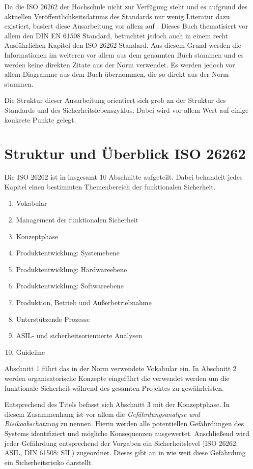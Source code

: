 \documentclass[a4paper,DIV=calc,ngerman]{scrartcl}
\begin{document}
Da die ISO 26262 der Hochschule nicht zur Verfügung steht und es aufgrund des aktuellen Veröffentlichkeitsdatums des Standards nur wenig Literatur dazu existiert, basiert diese Ausarbeitung vor allem auf \cite{1}. Dieses Buch thematisiert vor allem den DIN EN 61508 Standard, betrachtet jedoch auch in einem recht Ausführlichen Kapitel den ISO 26262 Standard. Aus diesem Grund werden die Informationen im weiteren vor allem aus dem genannten Buch stammen und es werden keine direkten Zitate aus der Norm verwendet. Es werden jedoch vor allem Diagramme aus dem Buch übernommen, die so direkt aus der Norm stammen.

Die Struktur dieser Ausarbeitung orientiert sich grob an der Struktur des Standards und des Sicherheitslebenszyklus. Dabei wird vor allem Wert auf einige konkrete Punkte gelegt.

\section{Struktur und Überblick ISO 26262}
\label{sec:Struktur}
Die ISO 26262 ist in insgesamt 10 Abschnitte aufgeteilt. Dabei behandelt jedes Kapitel einen bestimmten Themenbereich der funktionalen Sicherheit.

\begin{enumerate}
    \item Vokabular
    \item Management der funktionalen Sicherheit
    \item Konzeptphase
    \item Produktentwicklung: Systemebene
    \item Produktentwicklung: Hardwareebene
    \item Produktentwicklung: Softwareebene
    \item Produktion, Betrieb und Außerbetriebnahme
    \item Unterstützende Prozesse
    \item ASIL- und sicherheitsorientierte Analysen
    \item Guideline
\end{enumerate}

Abschnitt 1 führt das in der Norm verwendete Vokabular ein. In Abschnitt 2 werden organisatorische Konzepte eingeführt die verwendet werden um die funktionale Sicherheit während des gesamten Projektes zu gewährleisten.

Entsprechend des Titels befasst sich Abschnitt 3 mit der Konzeptphase. In diesem Zusammenhang ist vor allem die \emph{Gefährdungsanalyse und Risikoabschätzung} zu nennen. Hierin werden alle potentiellen Gefährdungen des Systems identifiziert und mögliche Konsequenzen ausgewertet. Anschließend wird jeder Gefährdung entsprechend der Vorgaben ein Sicherheitslevel (ISO 26262: ASIL, DIN 61508: SIL) zugeordnet. Dieses gibt an in wie weit diese Gefährdung ein Sicherheitsrisiko darstellt.
\end{document}
